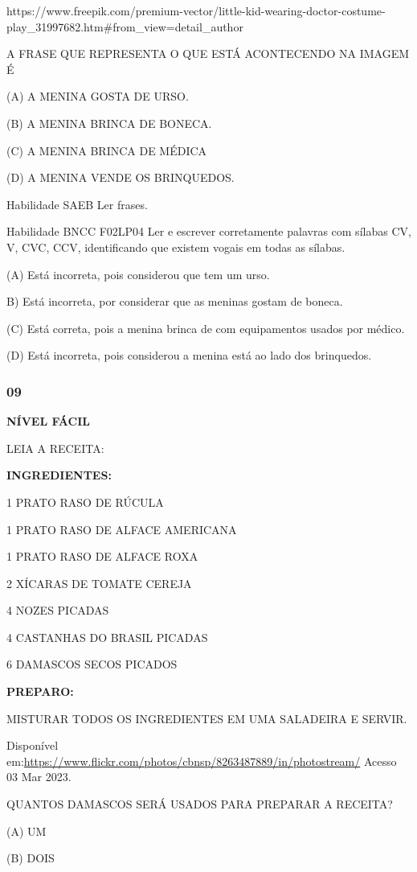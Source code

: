 https://www.freepik.com/premium-vector/little-kid-wearing-doctor-costume-play\_31997682.htm\#from\_view=detail\_author

A FRASE QUE REPRESENTA O QUE ESTÁ ACONTECENDO NA IMAGEM É

(A) A MENINA GOSTA DE URSO.

(B) A MENINA BRINCA DE BONECA.

(C) A MENINA BRINCA DE MÉDICA

(D) A MENINA VENDE OS BRINQUEDOS.

Habilidade SAEB Ler frases.

Habilidade BNCC F02LP04 Ler e escrever corretamente palavras com sílabas
CV, V, CVC, CCV, identificando que existem vogais em todas as sílabas.

(A) Está incorreta, pois considerou que tem um urso.

B) Está incorreta, por considerar que as meninas gostam de boneca.

(C) Está correta, pois a menina brinca de com equipamentos usados por
médico.

(D) Está incorreta, pois considerou a menina está ao lado dos
brinquedos.

\subsubsection{09}\label{section-135}

\textbf{NÍVEL FÁCIL}

LEIA A RECEITA:

\textbf{INGREDIENTES:}

1 PRATO RASO DE RÚCULA

1 PRATO RASO DE ALFACE AMERICANA

1 PRATO RASO DE ALFACE ROXA

2 XÍCARAS DE TOMATE CEREJA

4 NOZES PICADAS

4 CASTANHAS DO BRASIL PICADAS

6 DAMASCOS SECOS PICADOS

\textbf{PREPARO:}

MISTURAR TODOS OS INGREDIENTES EM UMA SALADEIRA E SERVIR.

Disponível
em:\url{https://www.flickr.com/photos/cbnsp/8263487889/in/photostream/}
Acesso 03 Mar 2023.

QUANTOS DAMASCOS SERÁ USADOS PARA PREPARAR A RECEITA?

(A) UM

(B) DOIS

